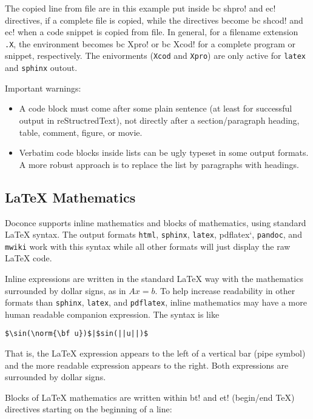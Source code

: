 \documentclass[%
oneside,                 %
final,                   %
10pt]{article}
\begin{document}
The copied line from file are in this example put inside \Verb!!bc shpro!
and \Verb!!ec! directives, if a complete file is copied, while the
directives become \Verb!!bc shcod! and \Verb!!ec! when a code snippet is copied
from file. In general, for a filename extension \Verb!.X!, the environment
becomes \Verb!!bc Xpro! or \Verb!!bc Xcod! for a complete program or snippet,
respectively. The enivorments (\Verb!Xcod! and \Verb!Xpro!) are only active
for \Verb!latex! and \Verb!sphinx! outout.

Important warnings:

\begin{itemize}
 \item A code block must come after some plain sentence (at least for successful
   output in reStructredText), not directly after a section/paragraph heading,
   table, comment, figure, or movie.

 \item Verbatim code blocks inside lists can be ugly typeset in some
   output formats. A more robust approach is to replace the list by
   paragraphs with headings.
\end{itemize}

\noindent
\subsection{{\LaTeX} Mathematics}

Doconce supports inline mathematics and blocks of mathematics, using
standard {\LaTeX} syntax. The output formats \Verb!html!, \Verb!sphinx!, \Verb!latex!,
pdflatex`, \Verb!pandoc!, and \Verb!mwiki! work with this syntax while all other
formats will just display the raw {\LaTeX} code.

Inline expressions are written in the standard
{\LaTeX} way with the mathematics surrounded by dollar signs, as in
$Ax=b$. To help increase readability in other formats than \Verb!sphinx!,
\Verb!latex!, and \Verb!pdflatex!, inline mathematics may have a more human
readable companion expression. The syntax is like
\begin{Verbatim}[numbers=none,fontsize=\fontsize{9pt}{9pt},baselinestretch=0.85,xleftmargin=0mm]
$\sin(\norm{\bf u})$|$sin(||u||)$
\end{Verbatim}
That is, the {\LaTeX} expression appears to the left of a vertical bar (pipe
symbol) and the more readable expression appears to the right. Both
expressions are surrounded by dollar signs.

Blocks of {\LaTeX} mathematics are written within
\Verb!!bt!
and
\Verb!!et! (begin/end TeX) directives starting on the beginning of a line:
\end{document}
